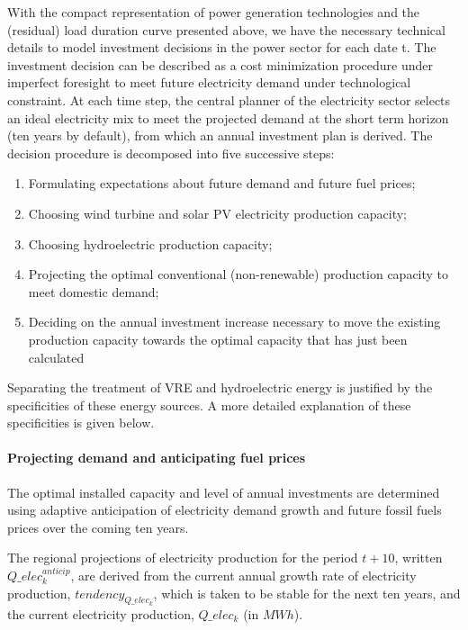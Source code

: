 With the compact representation of power generation technologies and the (residual) load duration curve presented above, we have the necessary technical details to model investment decisions in the power sector for each date t.
The investment decision can be described as a cost minimization procedure under imperfect foresight to meet future electricity demand under technological constraint. At each time step, the central planner of the electricity sector selects an ideal electricity mix to meet the projected demand at the short term horizon (ten years by default), from which an annual investment plan is derived.
The decision procedure is decomposed into five successive steps:
\begin{enumerate}
    \item Formulating expectations about future demand and future fuel prices;
    \item Choosing  wind turbine and solar PV  electricity production capacity;
    \item Choosing hydroelectric production capacity;
    \item Projecting the optimal conventional (non-renewable) production capacity to meet domestic demand;
    \item Deciding on the annual investment increase necessary to move the existing production capacity towards the optimal capacity that has just been calculated 
\end{enumerate} 

Separating the treatment of VRE and hydroelectric energy is justified by the specificities of these energy sources. A more detailed explanation of these specificities is given below.

\paragraph{Projecting demand and anticipating fuel prices}

The optimal installed capacity and level of annual investments are determined using adaptive anticipation of electricity demand growth and  future fossil fuels prices over the coming ten years.

The regional projections of electricity production for the period $t+10$, written $Q\_elec_k^{anticip}$, are derived from the current annual growth rate of electricity production, $tendency_{Q\_elec_k}$, which is taken to be stable for the next ten years, and the current electricity production, $Q\_elec_k$ (in $MWh$).

